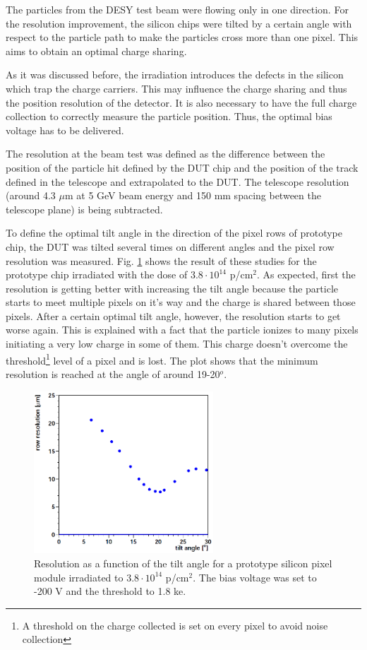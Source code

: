 The particles from the DESY test beam were flowing only in one direction. For the resolution improvement, the silicon chips were tilted by a certain 
angle with respect to the particle path to make the particles cross more than one pixel. This aims to obtain an optimal charge sharing.

As it was discussed before, the irradiation introduces the defects in the silicon which trap the charge carriers. This may influence the charge sharing
and thus the position resolution of the detector. It is also necessary to have the full charge collection to correctly measure the particle position.
Thus, the optimal bias voltage has to be delivered.

The resolution at the beam test was defined as the difference between the position of the particle hit defined by the DUT chip and the position of the
track defined in the telescope and extrapolated to the DUT. The telescope resolution (around 4.3 $\mu$m at 5 GeV beam energy and 150 mm spacing between
the telescope plane) is being subtracted.

To define the optimal tilt angle in the direction of the pixel rows of prototype chip, the DUT was tilted several times on different angles and the 
pixel row resolution was measured. Fig. \ref{fig:tilt_scan} shows the result of these studies for the prototype chip irradiated with the dose of
$3.8 \cdot 10^{14}$ p/cm$^2$. As expected, first the resolution is getting better with increasing the tilt angle because the particle starts to meet 
multiple pixels on it's way and the charge is shared between those pixels. After a certain optimal tilt angle, however, the resolution starts to get 
worse again. This is explained with a fact that the particle ionizes to many pixels initiating a very low charge in some of them. This charge doesn't
overcome the threshold\footnote{A threshold on the charge collected is set on every pixel to avoid noise collection} level of a pixel and is lost. 
The plot shows that the minimum resolution is reached at the angle of around 19-20$^{o}$.

\begin{figure}[t]
 \centering
 \includegraphics[width=0.6\textwidth]{021_pixel_upgrade/plots/tilt_scan.png}
 \caption{Resolution as a function of the tilt angle for a prototype silicon pixel module irradiated to $3.8 \cdot 10^{14}$ p/cm$^2$. The bias voltage  
 was set to -200 V and the threshold to 1.8 ke.}
 \label{fig:tilt_scan}
\end{figure}

